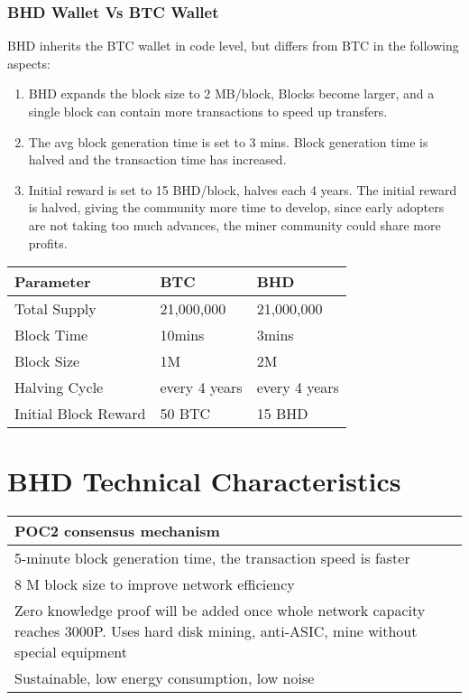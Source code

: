 \subsubsection{BHD Wallet Vs BTC Wallet}
\begin{flushleft}
    BHD inherits the BTC wallet in code level, but differs from BTC in the following aspects:
\end{flushleft}
\begin{enumerate}
    \item BHD expands the block size to 2 MB/block, Blocks become larger, and a single block can contain more transactions to speed up transfers.
    \item The avg block generation time is set to 3 mins. Block generation time is halved and the transaction time has increased.
    \item Initial reward is set to 15 BHD/block, halves each 4 years. The initial reward is halved, giving the community more time to develop, since early adopters are not taking too much advances, the miner community could share more profits.
\end{enumerate}
\begin{tabular}{ |p{5cm}|p{3cm}|p{3cm}| }
    \hline
    \rowcolor{lightgray} \textbf{Parameter} & \textbf{BTC} & \textbf{BHD} \\[5pt]
    \hline
    Total Supply & 21,000,000 & 21,000,000 \\[5pt]
    \rowcolor{lightgray!30} Block Time & 10mins & 3mins \\[5pt]
    Block Size & 1M & 2M \\[5pt]
    \rowcolor{lightgray!30} Halving Cycle & every 4 years & every 4 years \\[5pt]
    Initial Block Reward & 50 BTC & 15 BHD \\[5pt]
    \hline
\end{tabular}
\section{BHD Technical Characteristics}
\begin{tabular}{ |p{12cm}| }
    \hline
    POC2 consensus mechanism\\[5pt]
    \hline
    5-minute block generation time, the transaction speed is faster\\[5pt]
    \hline
    8 M block size to improve network efficiency\\[5pt]
    \hline
    Zero knowledge proof will be added once whole network capacity reaches 3000P. Uses hard disk mining, anti-ASIC, mine without special equipment\\[5pt]
    \hline
    Sustainable, low energy consumption, low noise\\[5pt]
    \hline
\end{tabular}
